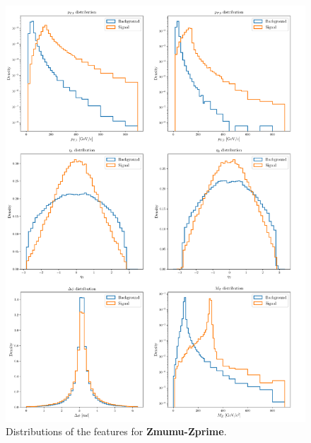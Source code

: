 \begin{figure}
	\centering
	\includegraphics[width=1.0\textwidth]{Python/Z/features_Zmumu_Zprime.pdf}
	\caption{Distributions of the features for \textbf{Zmumu-Zprime}.}
	\label{fig:Z_PRIME_FEATURES_DISTRIBUTIONS}
\end{figure}

